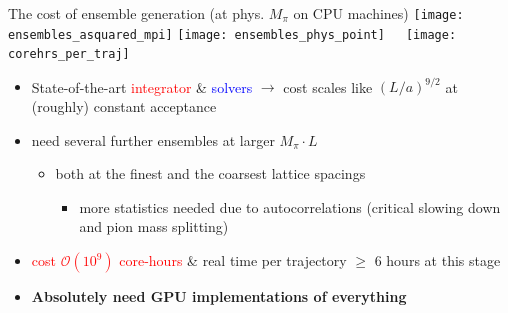 \documentclass[xcolor={dvipsnames,table}]{beamer}
\begin{document}
\begin{frame}{The cost of ensemble generation (at phys. $M_\pi$ on CPU machines)}
  \centering
  \texttt{[image: ensembles\_asquared\_mpi]}
  \texttt{[image: ensembles\_phys\_point]}
  \,\,\,\,\,
  \texttt{[image: corehrs\_per\_traj]}

  \begin{hpcablock}{}
    \footnotesize
    \begin{itemize}
      \item State-of-the-art \textcolor{red}{integrator} \& \textcolor{blue}{solvers} $\rightarrow$ cost scales like $(L/a)^{9/2}$ at (roughly) constant acceptance
      \vspace{0.19cm}
      \item need several further ensembles at larger $M_\pi \cdot L$ 
      \vspace{0.19cm}
      \begin{itemize}
        \item both at the finest and the coarsest lattice spacings
          \begin{itemize}
            \item more statistics needed due to autocorrelations (critical slowing down and pion mass splitting)
          \end{itemize}
      \end{itemize}
      \item \textcolor{red}{cost $\mathcal{O}(10^{9})$ core-hours} \& real time per trajectory $\geq$ 6 hours at this stage
      \vspace{0.19cm}
      \item \textbf{Absolutely need GPU implementations of everything}
    \end{itemize}
  \end{hpcablock}
\end{frame}
\end{document}
